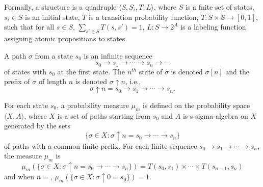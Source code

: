 Formally, a structure is a quadruple $\langle S, S_i, T, L\rangle$, where $S$ is a fnite set of states, $s_i\in S$ is an initial state, $T$ is a transition probability function, $T: S\times S \rightarrow [0,1]$, such that for all $s \in S$, $\sum_{s'\in S} T(s,s') = 1$, $L:S\rightarrow 2^A$ is a labeling function assigning atomic propositions to states.

A path $\sigma$ from a state $s_0$ is an infinite sequence
$$s_0\rightarrow s_1\rightarrow \cdots \rightarrow s_n \rightarrow \cdots
$$
of states with $s_0$ at the first state. The $n^{th}$ state of $\sigma$ is denoted $\sigma[n]$ and the prefix of $\sigma$ of length $n$ is denoted $\sigma\uparrow n$, i.e.,
$$\sigma\uparrow n = s_0\rightarrow s_1\rightarrow \cdots \rightarrow s_n.
$$

For each state $s_0$, a probability measure $\mu_m$ is defined on the probability space $\langle X, A\rangle$, where $X$ is a set of paths starting from $s_0$ and $A$ is s sigma-algebra on $X$ generated by the sets
$$\{ \sigma\in X : \sigma\uparrow n = s_0\rightarrow \cdots \rightarrow s_n\}
$$
of paths with a common finite prefix. For each finite sequence $s_0\rightarrow s_1\rightarrow \cdots \rightarrow s_n$, the measure $\mu_m$ is 
$$\mu_m(\{ \sigma\in X : \sigma\uparrow n = s_0\rightarrow \cdots \rightarrow s_n\}) = T(s_0,s_1)\times\cdots\times T(s_{n-1},s_n)
$$
and when $n=$, $\mu_m(\{ \sigma\in X : \sigma\uparrow 0 = s_0\}) = 1$.

